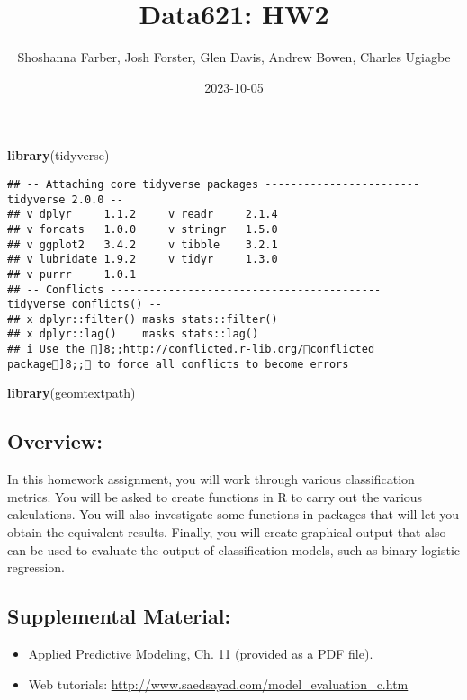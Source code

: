 \documentclass[
]{article}
\title{Data621: HW2}
\author{Shoshanna Farber, Josh Forster, Glen Davis, Andrew Bowen,
Charles Ugiagbe}
\date{2023-10-05}
\newenvironment{Shaded}{\begin{snugshade}}{\end{snugshade}}
\newcommand{\FunctionTok}[1]{\textcolor[rgb]{0.13,0.29,0.53}{\textbf{#1}}}
\newcommand{\NormalTok}[1]{#1}
\begin{document}
\maketitle

\begin{Shaded}
\begin{Highlighting}[]
\FunctionTok{library}\NormalTok{(tidyverse)}
\end{Highlighting}
\end{Shaded}

\begin{verbatim}
## -- Attaching core tidyverse packages ------------------------ tidyverse 2.0.0 --
## v dplyr     1.1.2     v readr     2.1.4
## v forcats   1.0.0     v stringr   1.5.0
## v ggplot2   3.4.2     v tibble    3.2.1
## v lubridate 1.9.2     v tidyr     1.3.0
## v purrr     1.0.1     
## -- Conflicts ------------------------------------------ tidyverse_conflicts() --
## x dplyr::filter() masks stats::filter()
## x dplyr::lag()    masks stats::lag()
## i Use the ]8;;http://conflicted.r-lib.org/conflicted package]8;; to force all conflicts to become errors
\end{verbatim}

\begin{Shaded}
\begin{Highlighting}[]
\FunctionTok{library}\NormalTok{(geomtextpath)}
\end{Highlighting}
\end{Shaded}

\hypertarget{overview}{%
\subsection{Overview:}\label{overview}}

In this homework assignment, you will work through various
classification metrics. You will be asked to create functions in R to
carry out the various calculations. You will also investigate some
functions in packages that will let you obtain the equivalent results.
Finally, you will create graphical output that also can be used to
evaluate the output of classification models, such as binary logistic
regression.

\hypertarget{supplemental-material}{%
\subsection{Supplemental Material:}\label{supplemental-material}}

\begin{itemize}
\item
  Applied Predictive Modeling, Ch. 11 (provided as a PDF file).
\item
  Web tutorials: \url{http://www.saedsayad.com/model_evaluation_c.htm}
\end{itemize}
\end{document}
